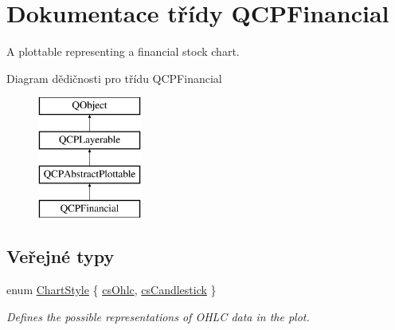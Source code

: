 \hypertarget{classQCPFinancial}{}\section{Dokumentace třídy Q\+C\+P\+Financial}
\label{classQCPFinancial}


A plottable representing a financial stock chart.  


Diagram dědičnosti pro třídu Q\+C\+P\+Financial\begin{figure}[H]
\begin{center}
\leavevmode
\includegraphics[height=4.000000cm]{classQCPFinancial}
\end{center}
\end{figure}
\subsection*{Veřejné typy}
\begin{DoxyCompactItemize}
\item 
enum \hyperlink{classQCPFinancial_a0f800e21ee98d646dfc6f8f89d10ebfb}{Chart\+Style} \{ \hyperlink{classQCPFinancial_a0f800e21ee98d646dfc6f8f89d10ebfba3a516016c9298d3e95dd82aa203c4390}{cs\+Ohlc}, 
\hyperlink{classQCPFinancial_a0f800e21ee98d646dfc6f8f89d10ebfbac803cbd39f26e3f206bcc7028679e62f}{cs\+Candlestick}
 \}\begin{DoxyCompactList}\small\item\em Defines the possible representations of O\+H\+L\+C data in the plot. \end{DoxyCompactList}
\end{DoxyCompactItemize}
